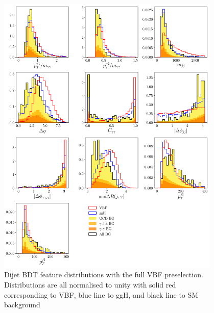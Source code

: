 \begin{figure}[h!]
    \includegraphics[width=0.95\textwidth]{figures/event_selection/dijet_BDT_features_splitBG_PS.pdf}
    \caption{Dijet BDT feature distributions with the full VBF preselection. Distributions are all normalised to unity with solid red corresponding to VBF, blue line to ggH, and black line to SM background}
    \label{fig:event_categorisaton:dijet_bdt_features}
\end{figure}


